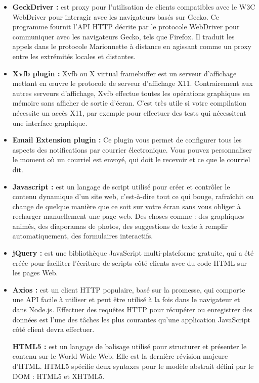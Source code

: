 \begin{itemize}
	\item \textbf{GeckDriver \cite{geckodrive} :} est proxy pour l'utilisation de clients compatibles avec le W3C WebDriver pour interagir avec les navigateurs basés sur Gecko. Ce programme fournit l'API HTTP décrite par le protocole WebDriver pour communiquer avec les navigateurs Gecko, tels que Firefox. Il traduit les appels dans le protocole Marionnette à distance en agissant comme un proxy entre les extrémités locales et distantes.
	\item \textbf{Xvfb plugin \cite{xvfb} : } Xvfb ou X virtual framebuffer est un serveur d'affichage mettant en œuvre le protocole de serveur d'affichage X11. Contrairement aux autres serveurs d'affichage, Xvfb effectue toutes les opérations graphiques en mémoire sans afficher de sortie d'écran. C'est très utile si votre compilation nécessite un accès X11, par exemple pour effectuer des tests qui nécessitent une interface graphique.
	\item \textbf{Email Extension plugin \cite{emailextension} :} Ce plugin vous permet de configurer tous les aspects des notifications par courrier électronique. Vous pouvez personnaliser le moment où un courriel est envoyé, qui doit le recevoir et ce que le courriel dit.
	\item \textbf{Javascript \cite{js} :} est un langage de script utilisé pour créer et contrôler le contenu dynamique d'un site web, c'est-à-dire tout ce qui bouge, rafraîchit ou change de quelque manière que ce soit sur votre écran sans vous obliger à recharger manuellement une page web. Des choses comme : des graphiques animés, des diaporamas de photos, des suggestions de texte à remplir automatiquement, des formulaires interactifs.
	
	\item \textbf{jQuery \cite{jquery} :} est une bibliothèque JavaScript multi-plateforme gratuite, qui a été créée pour faciliter l'écriture de scripts côté clients avec du code HTML sur les pages Web.
	
	\item \textbf{Axios \cite{axios} :} est un client HTTP populaire, basé sur la promesse, qui comporte une API facile à utiliser et peut être utilisé à la fois dans le navigateur et dans Node.js. Effectuer des requêtes HTTP pour récupérer ou enregistrer des données est l'une des tâches les plus courantes qu'une application JavaScript côté client devra effectuer.
	
	\textbf{HTML5 \cite{html} :} est un langage de balisage utilisé pour structurer et présenter le contenu sur le World Wide Web. Elle est la dernière révision majeure d'HTML. HTML5 spécifie deux syntaxes pour le modèle abstrait défini par le DOM : HTML5 et XHTML5.
	

\end{itemize}
